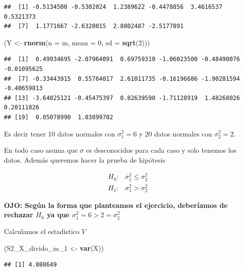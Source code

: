 \documentclass[
  12pt,
]{book}
\newenvironment{Shaded}{\begin{snugshade}}{\end{snugshade}}
\newcommand{\DataTypeTok}[1]{\textcolor[rgb]{0.13,0.29,0.53}{#1}}
\newcommand{\DecValTok}[1]{\textcolor[rgb]{0.00,0.00,0.81}{#1}}
\newcommand{\KeywordTok}[1]{\textcolor[rgb]{0.13,0.29,0.53}{\textbf{#1}}}
\newcommand{\NormalTok}[1]{#1}
\newcommand{\StringTok}[1]{\textcolor[rgb]{0.31,0.60,0.02}{#1}}
\begin{document}
\begin{verbatim}
##  [1] -0.5134500 -0.5302024  1.2389622 -0.4478856  3.4616537  0.5321373
##  [7]  1.1771667 -2.6328015  2.8802487 -2.5177891
\end{verbatim}

\begin{Shaded}
\begin{Highlighting}[]
\NormalTok{(Y \textless{}{-}}\StringTok{ }\KeywordTok{rnorm}\NormalTok{(}\DataTypeTok{n =}\NormalTok{ m, }\DataTypeTok{mean =} \DecValTok{0}\NormalTok{, }\DataTypeTok{sd =} \KeywordTok{sqrt}\NormalTok{(}\DecValTok{2}\NormalTok{)))}
\end{Highlighting}
\end{Shaded}

\begin{verbatim}
##  [1]  0.49934695 -2.07964091  0.69759310 -1.06023500 -0.48490076 -0.01095625
##  [7] -0.33443915  0.55764017  2.61011735 -0.16196686 -1.90281594 -0.40659813
## [13] -3.64025121 -0.45475397  0.82639590 -1.71128919  1.48268026  0.20111826
## [19]  0.05078990  1.03899702
\end{verbatim}

Es decir tener 10 datos normales con \(\sigma_1^2 = 6\) y 20 datos normales con \(\sigma_2^2 = 2\).

En todo caso asuma que \(\sigma\) es desconocidos para cada caso y solo tenemos
los datos. Además queremos hacer la prueba de hipótesis

\[
\begin{array}{ll}
H_{0}: & \sigma_{1}^{2} \leq \sigma_{2}^{2} \\
H_{1}: & \sigma_{1}^{2}>\sigma_{2}^{2}
\end{array}
\]

\textbf{OJO: Según la forma que planteamos el ejercicio, deberíamos de rechazar \(H_0\) ya que \(\sigma_1^2 = 6 > 2 = \sigma_2^2\)}

Calculamos el estadístico \(V\)

\begin{Shaded}
\begin{Highlighting}[]
\NormalTok{(S2\_X\_divido\_m\_}\DecValTok{1}\NormalTok{ \textless{}{-}}\StringTok{ }\KeywordTok{var}\NormalTok{(X))}
\end{Highlighting}
\end{Shaded}

\begin{verbatim}
## [1] 4.088649
\end{verbatim}
\end{document}
